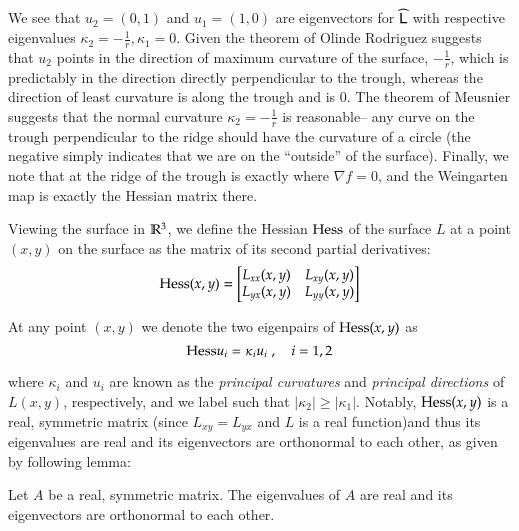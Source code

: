       We see that $u_2 = (0,1)$ and $u_1 = (1,0)$ are eigenvectors for $\widehat{\mathsf{L}}$ with respective eigenvalues
      $\kappa_2 = -\frac{1}{r} , \kappa_1 = 0$. Given the theorem of Olinde Rodriguez suggests that $u_2$ points in the direction of maximum curvature of the surface, $-\frac{1}{r}$, which is predictably in the direction directly perpendicular to the trough, whereas the direction of least curvature is along the trough and is $0$. The theorem of Meusnier suggests that the normal curvature $\kappa_2 = -\frac{1}{r}$ is reasonable-- any curve on the trough perpendicular to the ridge should have the curvature of a circle (the negative simply indicates that we are on the ``outside'' of the surface). Finally, we note that at the ridge of the trough is exactly where $\nabla f = 0$, and the Weingarten map is exactly the Hessian matrix there.
      
      Viewing the surface in $\mathbb{R}^3$, we define the Hessian  $\mathrm{Hess}$ of the surface $L$
      at a point $(x,y)$ on the surface as the matrix of its second partial derivatives:
      \begin{equation}
      \mathrm{Hess}(x,y) = \begin{bmatrix}
      L_{xx}(x,y) & L_{xy}(x,y) \\
      L_{yx}(x,y) & L_{yy}(x,y)
      \end{bmatrix}
      \end{equation}
      
      At any point $(x,y)$ we denote the two eigenpairs of $\mathrm{Hess}(x,y)$ as
      \begin{equation}
      \mathrm{Hess} u_i = \kappa_i u_i \; , \quad i = 1,2
      \end{equation}
      
      where $\kappa_i$ and $u_i$ are known as the
      \textit{principal curvatures} and \textit{principal directions}  of $L(x,y)$, respectively, and we label such that $|\kappa_2| \ge |\kappa_1|$. Notably, $\mathrm{Hess}(x,y)$ is a real, symmetric matrix (since  $L_{xy} = L_{yx}$ and $L$ is a real function)and thus its eigenvalues are real and its eigenvectors are orthonormal to each other, as given by following lemma:
      
      \begin{lemma}
      	Let $A$ be a real, symmetric matrix. The eigenvalues of $A$ are real and its eigenvectors are orthonormal to each other.
      \end{lemma}
      
